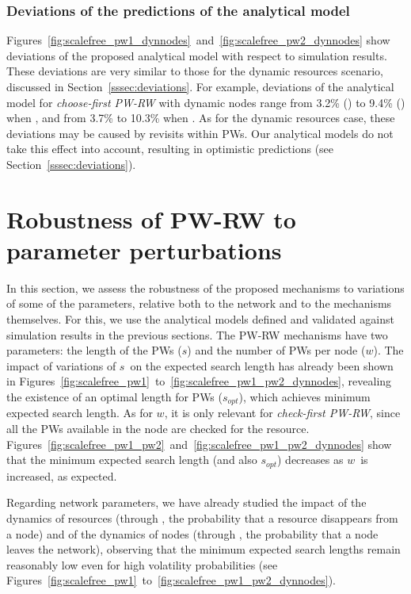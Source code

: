 \documentclass[]{elsarticle}
\newcommand{\s}		{\ensuremath{s}}		\newcommand{\sopt}	{\ensuremath{s_{opt}}}		\newcommand{\p}		{\ensuremath{p}}		\newcommand{\W}		{\ensuremath{W}}		\newcommand{\w}		{\ensuremath{w}}		\newcommand{\lsave}	{\ensuremath{\overline{l}_s}}	\newcommand{\lave}	{\ensuremath{\overline{l}}}	\newcommand{\lopt}	{\ensuremath{\overline{l}_{opt}}}
\begin{document}
\subsubsection{Deviations of the predictions of the analytical model}
\label{sssec:deviations2}

Figures~\ref{fig:scalefree_pw1_dynnodes}~and~\ref{fig:scalefree_pw2_dynnodes} show deviations of the proposed analytical model with respect to simulation results. These deviations are very similar to those for the dynamic resources scenario, discussed in Section~\ref{sssec:deviations}. For example, deviations of the analytical model for \emph{choose-first PW-RW} with dynamic nodes range from 3.2\% () to 9.4\% () when , and from 3.7\% to 10.3\% when . 
As for the dynamic resources case, these deviations may be caused by revisits within PWs. Our analytical models do not take this effect into account, resulting in optimistic predictions (see Section~\ref{sssec:deviations}). 

\section{Robustness of PW-RW to parameter perturbations}

In this section, we assess the robustness of the proposed mechanisms to variations of some of the parameters, relative both to the network and to the mechanisms themselves. For this, we use the analytical models defined and validated against simulation results in the previous sections. The PW-RW mechanisms have two parameters: the length of the PWs (\s) and the number of PWs per node (\w). The impact of variations of \s\ on the expected search length has already been shown in Figures~\ref{fig:scalefree_pw1}~to~\ref{fig:scalefree_pw1_pw2_dynnodes}, revealing the existence of an optimal length for PWs (\sopt), which achieves minimum expected search length. As for \w, it is only relevant for  \emph{check-first PW-RW}, since all the PWs available in the node are checked for the resource. Figures~\ref{fig:scalefree_pw1_pw2}~and~\ref{fig:scalefree_pw1_pw2_dynnodes} show that the minimum expected search length (and also \sopt) decreases as \w\ is increased, as expected. 

Regarding network parameters, we have already studied the impact of the dynamics of resources (through , the probability that a resource disappears from a node) and of the dynamics of nodes (through , the probability that a node leaves the network), observing that the minimum expected search lengths remain reasonably low even for high volatility probabilities (see Figures~\ref{fig:scalefree_pw1}~to~\ref{fig:scalefree_pw1_pw2_dynnodes}).
\end{document}
